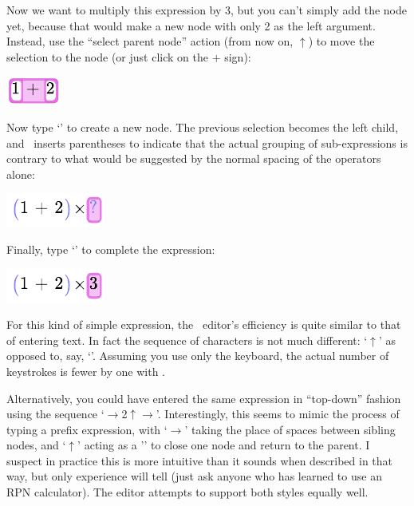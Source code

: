 Now we want to multiply this expression by 3, but you can't simply add the  node yet, because that would make a new node with only 2 as the left argument. Instead, use the ``select parent node'' action (from now on, $\uparrow$) to move the selection to the  node (or just click on the $+$ sign):
\begin{center}
\includegraphics{src/image/expr5.pdf}
\end{center}

Now type `\clojure{*}' to create a new node. The previous selection becomes the left child, and \Meta\ inserts parentheses to indicate that the actual grouping of sub-expressions is contrary to what would be suggested by the normal spacing of the operators alone:
\begin{center}
\includegraphics{src/image/expr6.pdf}
\end{center}

Finally, type `' to complete the expression:
\begin{center}
\includegraphics{src/image/expr7.pdf}
\end{center}

For this kind of simple expression, the \Meta\ editor's efficiency is quite similar to that of entering text. In fact the sequence of characters is not much different: `$\uparrow$' as opposed to, say, `'. Assuming you use only the keyboard, the actual number of keystrokes is fewer by one with \Meta.

Alternatively, you could have entered the same expression in ``top-down'' fashion using the sequence `$\rightarrow${2}$\uparrow\rightarrow$'. Interestingly, this seems to mimic the process of typing a prefix expression, with `$\rightarrow$' taking the place of spaces between sibling nodes, and `$\uparrow$' acting as a '\clojure{)}' to close one node and return to the parent. I suspect in practice this is more intuitive than it sounds when described in that way, but only experience will tell (just ask anyone who has learned to use an RPN calculator). The editor attempts to support both styles equally well.

